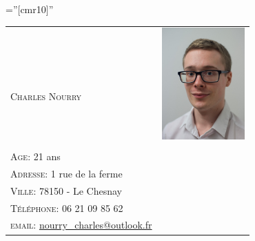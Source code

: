 \documentclass[a4paper,10pt]{article}
\begin{document}
\pagestyle{empty} %

\font\fb=''[cmr10]'' %




  \begin{tabular}{ p{11cm}r }
   & \multirow{2}{1.5in}{\includegraphics[width=1.25in]{pic}}\\
   \scshape{\Huge{Charles Nourry}} & \\
   \\
   \textsc{Age:} 21 ans &\\
    \textsc{Adresse:} 1 rue de la ferme &\\
    \textsc{Ville:} 78150 - Le Chesnay&\\
    \textsc{Téléphone:} 06 21 09 85 62&\\
    \textsc{email:} \href{mailto:nourry\_charles@outlook.fr}{nourry\_charles@outlook.fr}& %
  \end{tabular}

\end{document}
